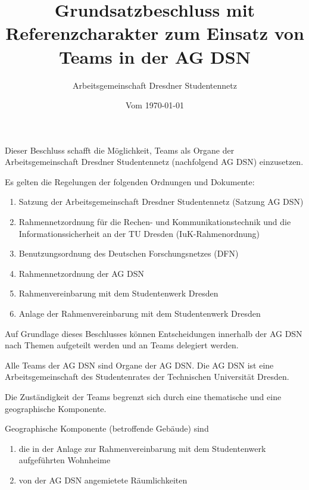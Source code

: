 


\title{Grundsatzbeschluss mit Referenzcharakter zum Einsatz von Teams in der AG DSN}
\author{Arbeitsgemeinschaft Dresdner Studentennetz}
\date{Vom \today}
\maketitle

\begin{contract}


Dieser Beschluss schafft die Möglichkeit, Teams als Organe der Arbeitsgemeinschaft Dresdner Studentennetz (nachfolgend AG DSN) einzusetzen.

Es gelten die Regelungen der folgenden Ordnungen und Dokumente:
\begin{enumerate}
  \item Satzung der Arbeitsgemeinschaft Dresdner Studentennetz (Satzung AG DSN)
  \item Rahmennetzordnung für die Rechen- und Kommunikationstechnik und die Informationssicherheit an der TU Dresden (IuK-Rahmenordnung)
  \item Benutzungsordnung des Deutschen Forschungsnetzes (DFN)
  \item Rahmennetzordnung der AG DSN
  \item Rahmenvereinbarung mit dem Studentenwerk Dresden
  \item Anlage der Rahmenvereinbarung mit dem Studentenwerk Dresden
\end{enumerate}

Auf Grundlage dieses Beschlusses können Entscheidungen innerhalb der AG DSN nach Themen aufgeteilt werden und an Teams delegiert werden.


Alle Teams der AG DSN sind Organe der AG DSN. Die AG DSN ist eine Arbeitsgemeinschaft des Studentenrates der Technischen Universität Dresden.

Die Zuständigkeit der Teams begrenzt sich durch eine thematische und eine geographische Komponente.

Geographische Komponente (betroffende Gebäude) sind
\begin{enumerate}
  \item die in der Anlage zur Rahmenvereinbarung mit dem Studentenwerk aufgeführten Wohnheime
  \item von der AG DSN angemietete Räumlichkeiten
\end{enumerate}


\end{contract}
